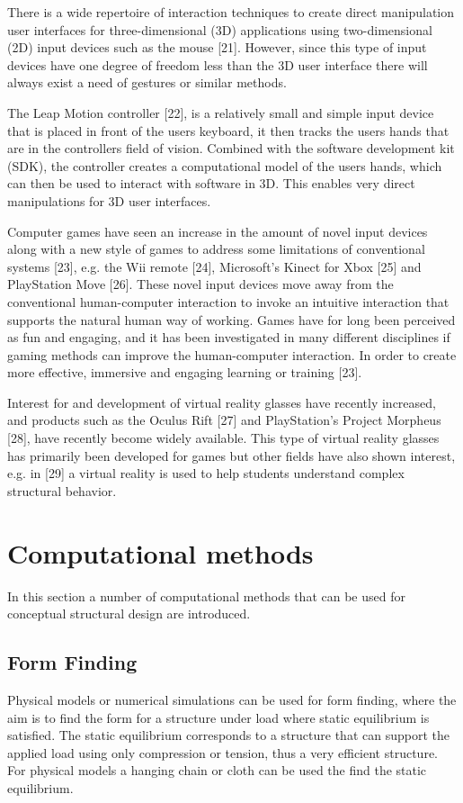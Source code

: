 There is a wide repertoire of interaction techniques to create direct manipulation user interfaces for three-dimensional (3D) applications using two-dimensional (2D) input devices such as the mouse [21]. However, since this type of input devices have one degree of freedom less than the 3D user interface there will always exist a need of gestures or similar methods. 

The Leap Motion controller [22], is a relatively small and simple input device that is placed in front of the users keyboard, it then tracks the users hands that are in the controllers field of vision. Combined with the software development kit (SDK), the controller creates a computational model of the users hands, which can then be used to interact with software in 3D. This enables very direct manipulations for 3D user interfaces.

Computer games have seen an increase in the amount of novel input devices along with a new style of games to address some limitations of conventional systems [23], e.g. the Wii remote [24], Microsoft’s Kinect for Xbox [25] and PlayStation Move [26]. These novel input devices move away from the conventional human-computer interaction to invoke an intuitive interaction that supports the natural human way of working. Games have for long been perceived as fun and engaging, and it has been investigated in many different disciplines if gaming methods can improve the human-computer interaction. In order to create more effective, immersive and engaging learning or training [23]. 

Interest for and development of virtual reality glasses have recently increased, and products such as the Oculus Rift [27] and PlayStation’s Project Morpheus [28], have recently become widely available. This type of virtual reality glasses has primarily been developed for games but other fields have also shown interest, e.g. in [29] a virtual reality is used to help students understand complex structural behavior.

\chapter{Computational methods}
\label{ch:Computational methods}
In this section a number of computational methods that can be used for conceptual structural design are introduced. 

\section{Form Finding}
Physical models or numerical simulations can be used for form finding, where the aim is to find the form for a structure under load where static equilibrium is satisfied. The static equilibrium corresponds to a structure that can support the applied load using only compression or tension, thus a very efficient structure. For physical models a hanging chain or cloth can be used the find the static equilibrium.


